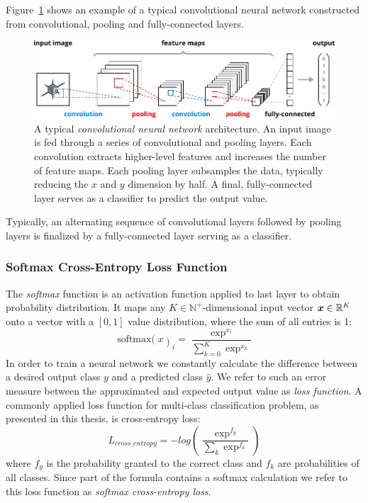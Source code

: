 	Figure~\ref{fig:convnet} shows an example of a typical convolutional neural network constructed from convolutional, pooling and fully-connected layers.
		\begin{figure}[tp]
  		\centering
    	\includegraphics{img/convnet.pdf}
    	\caption{A typical \emph{convolutional neural network} architecture. An input image is fed through a series of convolutional and pooling layers. Each convolution extracts higher-level features and increases the number of feature maps. Each pooling layer subsamples the data, typically reducing the $x$ and $y$ dimension by half. A final, fully-connected layer serves as a classifier to predict the output value.}
    	\label{fig:convnet}
	\end{figure}
	Typically, an alternating sequence of convolutional layers followed by pooling layers is finalized by a fully-connected layer serving as a  classifier.

\subsubsection{Softmax Cross-Entropy Loss Function}
The \emph{softmax} function is an activation function applied to last layer to obtain probability distribution. It maps any $K \in\mathbb{N}^+$-dimensional input vector $\boldsymbol{x} \in\mathbb{R}^K$ onto a vector with a $[0, 1]$ value distribution, where the sum of all entries is \num{1}:
%
$$
\operatorname{softmax(}x\operatorname{)}_i= \frac{\exp^{x_i}}{\sum_{k=0}^K \exp^{x_k}}
$$
%
In order to train a neural network we constantly calculate the difference between a desired output class $y$ and a predicted class $\hat{y}$. We refer to such an error measure between the approximated and expected output value as \emph{loss function}. A commonly applied loss function for multi-class classification problem, as presented in this thesis, is cross-entropy loss:
%
$$
L_{cross\_entropy} = -log \left( \frac{\exp^{f_y}}{\sum_k \exp^{f_k}} \right)
$$
%
where $f_y$ is the probability granted to the correct class and $f_k$ are probabilities of all classes. Since part of the formula contains a softmax calculation we refer to this loss function as \emph{softmax cross-entropy loss}.

